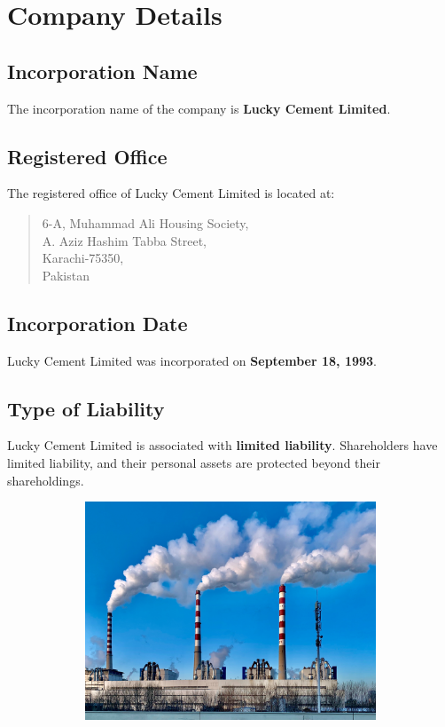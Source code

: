 \documentclass{article}
\begin{document}
\newpage


\vspace{42pt}
\section{Company Details}
\vspace{22pt}
\subsection{Incorporation Name}
The incorporation name of the company is \textbf{Lucky Cement Limited}.

\vspace{22pt}
\subsection{Registered Office}
The registered office of Lucky Cement Limited is located at:
\begin{quote}
6-A, Muhammad Ali Housing Society, \\
A. Aziz Hashim Tabba Street, \\
Karachi-75350, \\
Pakistan
\end{quote}

\vspace{22pt}
\subsection{Incorporation Date}
Lucky Cement Limited was incorporated on \textbf{September 18, 1993}.

\vspace{22pt}
\subsection{Type of Liability}
Lucky Cement Limited is associated with \textbf{limited liability}. Shareholders have limited liability, and their personal assets are protected beyond their shareholdings.

\begin{figure}[b]
  \centering
  \includegraphics[width=1.1\textwidth, height=6.5cm]{pictures/second.jpg}
\end{figure}
\end{document}
